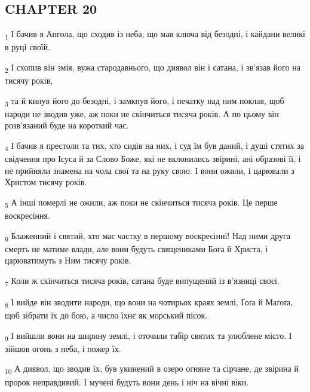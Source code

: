 \subsection{CHAPTER 20}
\begin{tcolorbox}
\textsubscript{1} І бачив я Ангола, що сходив із неба, що мав ключа від безодні, і кайдани великі в руці своїй.
\end{tcolorbox}
\begin{tcolorbox}
\textsubscript{2} І схопив він змія, вужа стародавнього, що диявол він і сатана, і зв'язав його на тисячу років,
\end{tcolorbox}
\begin{tcolorbox}
\textsubscript{3} та й кинув його до безодні, і замкнув його, і печатку над ним поклав, щоб народи не зводив уже, аж поки не скінчиться тисяча років. А по цьому він розв'язаний буде на короткий час.
\end{tcolorbox}
\begin{tcolorbox}
\textsubscript{4} І бачив я престоли та тих, хто сидів на них, і суд їм був даний, і душі стятих за свідчення про Ісуса й за Слово Боже, які не вклонились звірині, ані образові її, і не прийняли знамена на чола свої та на руку свою. І вони ожили, і царювали з Христом тисячу років.
\end{tcolorbox}
\begin{tcolorbox}
\textsubscript{5} А інші померлі не ожили, аж поки не скінчиться тисяча років. Це перше воскресіння.
\end{tcolorbox}
\begin{tcolorbox}
\textsubscript{6} Блаженний і святий, хто має частку в першому воскресінні! Над ними друга смерть не матиме влади, але вони будуть священиками Бога й Христа, і царюватимуть з Ним тисячу років.
\end{tcolorbox}
\begin{tcolorbox}
\textsubscript{7} Коли ж скінчиться тисяча років, сатана буде випущений із в'язниці своєї.
\end{tcolorbox}
\begin{tcolorbox}
\textsubscript{8} І вийде він зводити народи, що вони на чотирьох краях землі, Ґоґа й Маґоґа, щоб зібрати їх до бою, а число їхнє як морський пісок.
\end{tcolorbox}
\begin{tcolorbox}
\textsubscript{9} І вийшли вони на ширину землі, і оточили табір святих та улюблене місто. І зійшов огонь з неба, і пожер їх.
\end{tcolorbox}
\begin{tcolorbox}
\textsubscript{10} А диявол, що зводив їх, був укинений в озеро огняне та сірчане, де звірина й пророк неправдивий. І мучені будуть вони день і ніч на вічні віки.
\end{tcolorbox}
